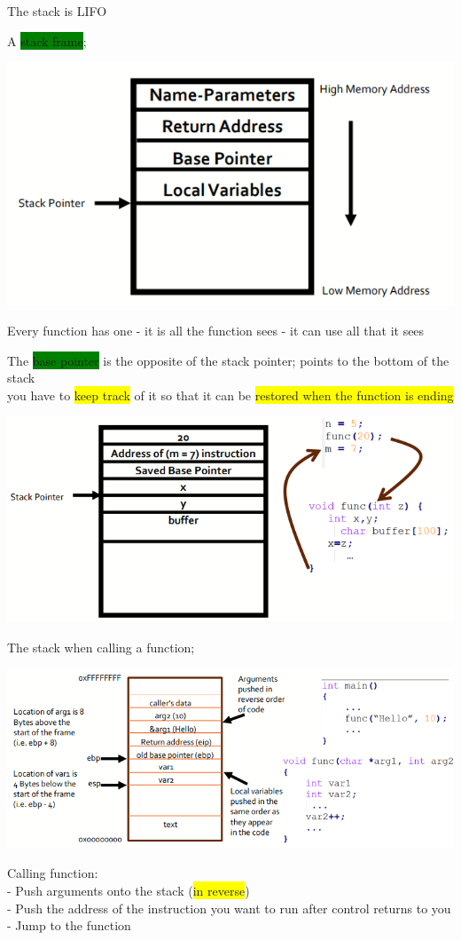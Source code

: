 \documentclass[]{project_plan}
\begin{document}
The stack is LIFO

A \colorbox{green}{stack frame};

\includegraphics[width=.6\linewidth]{lec6 stack frame.png}

Every function has one - it is all the function sees - it can use all that it sees

The \colorbox{green}{base pointer} is the opposite of the stack pointer; points to the bottom of the stack\\
you have to \colorbox{yellow}{keep track} of it so that it can be \colorbox{yellow}{restored when the function is ending}

\includegraphics[width=.8\linewidth]{lec6 stack frame eg.png}

The stack when calling a function;

\includegraphics[width=.8\linewidth]{lec6 when calling a function.png}

Calling function:\\
- Push arguments onto the stack (\colorbox{yellow}{in reverse})\\
- Push the address of the instruction you want to run after control returns to you\\
- Jump to the function
\end{document}
